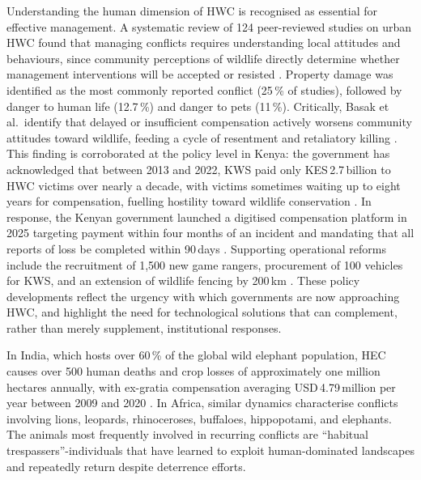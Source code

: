 \documentclass[12pt,a4paper]{article}
\begin{document}
    Understanding the human dimension of HWC is recognised as essential for effective
    management. A systematic review of 124 peer-reviewed studies on urban HWC found that
    managing conflicts requires understanding local attitudes and behaviours, since community
    perceptions of wildlife directly determine whether management interventions will be
    accepted or resisted \cite{basak2023}. Property damage was identified as the most commonly
    reported conflict (25\,\% of studies), followed by danger to human life (12.7\,\%) and
    danger to pets (11\,\%). Critically, Basak et al.\ identify that delayed or insufficient
    compensation actively worsens community attitudes toward wildlife, feeding a cycle of
    resentment and retaliatory killing \cite{basak2023}. This finding is corroborated at the
    policy level in Kenya: the government has acknowledged that between 2013 and 2022,
    KWS paid only KES\,2.7\,billion to HWC victims over nearly a decade, with victims
    sometimes waiting up to eight years for compensation, fuelling hostility toward wildlife
    conservation \cite{kenya2025}. In response, the Kenyan government launched a digitised
    compensation platform in 2025 targeting payment within four months of an incident and
    mandating that all reports of loss be completed within 90\,days \cite{kenya2025}. Supporting
    operational reforms include the recruitment of 1,500 new game rangers, procurement of
    100 vehicles for KWS, and an extension of wildlife fencing by 200\,km \cite{kenya2025}.
    These policy developments reflect the urgency with which governments are now approaching
    HWC, and highlight the need for technological solutions that can complement, rather than
    merely supplement, institutional responses.

    In India, which hosts over 60\,\% of the global wild elephant population, HEC causes over
    500 human deaths and crop losses of approximately one million hectares annually, with
    ex-gratia compensation averaging USD\,4.79\,million per year between 2009 and 2020
    \cite{muliya2026}. In Africa, similar dynamics characterise conflicts involving lions,
    leopards, rhinoceroses, buffaloes, hippopotami, and elephants. The animals most frequently
    involved in recurring conflicts are ``habitual trespassers''-individuals that have learned to
    exploit human-dominated landscapes and repeatedly return despite deterrence efforts.
\end{document}
